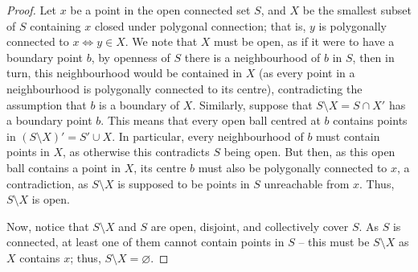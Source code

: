 \documentclass{article}
\theoremstyle{definition}
\begin{document}
\begin{proof}
	Let $x$ be a point in the open connected set $S$, and $X$ be the smallest subset of $S$ containing $x$ closed under polygonal connection; that is, $y$ is polygonally connected to $x\iff y\in X$. We note that $X$ must be open, as if it were to have a boundary point $b$, by openness of $S$ there is a neighbourhood of $b$ in $S$, then in turn, this neighbourhood would be contained in $X$ (as every point in a neighbourhood is polygonally connected to its centre), contradicting the assumption that $b$ is a boundary of $X$.
	Similarly, suppose that $S\setminus X=S\cap X'$ has a boundary point $b$. This means that every open ball centred at $b$ contains points in $(S\setminus X)'=S'\cup X$. In particular, every neighbourhood of $b$ must contain points in $X$, as otherwise this contradicts $S$ being open. But then, as this open ball contains a point in $X$, its centre $b$ must also be polygonally connected to $x$, a contradiction, as $S\setminus X$ is supposed to be points in $S$ unreachable from $x$. Thus, $S\setminus X$ is open.\par
	Now, notice that $S\setminus X$ and $S$ are open, disjoint, and collectively cover $S$. As $S$ is connected, at least one of them cannot contain points in $S$ -- this must be $S\setminus X$ as $X$ contains $x$; thus, $S\setminus X=\varnothing$.
\end{proof}

\newpage
\end{document}
